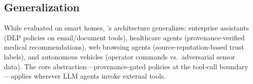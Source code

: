 \subsection{Generalization}

While evaluated on smart homes, \sys{}'s architecture generalizes: enterprise assistants (DLP policies on email/document tools), healthcare agents (provenance-verified medical recommendations), web browsing agents (source-reputation-based trust labels), and autonomous vehicles (operator commands vs.\ adversarial sensor data). The core abstraction---provenance-gated policies at the tool-call boundary---applies wherever LLM agents invoke external tools.
